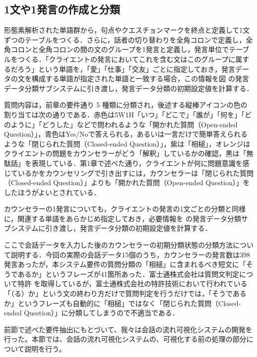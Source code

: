 \documentclass[shuuron]{kuee}
\begin{document}
\subsection{1文や1発言の作成と分類}
形態素解析された単語群から，句点やクエスチョンマークを終点と定義して1文ずつのテーブルをつくる．さらに，話者の切り替わりを全角コロンで定義し，全角コロンと全角コロンの間の文のグループを1発言と定義し，発言単位でテーブルをつくる．「クライエントの発言においてこれを含む文はこのグループに属するだろう」という単語を，「愛」「仕事」「交友」ごとに指定しておき，発言データの文を構成する単語が指定された単語と一致する場合，この情報を図
の発言データ分類サブシステムに引き渡し，発言データ分類の初期設定値を計算する．



質問内容は，前章の要件通り 5 種類に分類され，後述する縦棒アイコンの色の割り当ては次の通りである．赤色は5W1H「いつ」「どこで」「誰が」「何を」「どのように」「どうした」などで問われるような「開かれた質問（Open-ended Question）」，青色はYes/Noで答えられる，あるいは一言だけで簡単答えられるような「閉じられた質問（Closed-ended Question）」，紫は「相槌」，オレンジはクライエントの問題をカウンセラーがどう「解釈」しているかの確認，黒は「無駄話」を表現している．第1章で述べた通り，クライエントが何に問題意識を感じているかをカウンセリングで引き出すには，カウンセラーは「閉じられた質問（Closed-ended Question）」よりも「開かれた質問（Open-ended Question）」をしたほうがよいとされている．


カウンセラーの1発言についても，クライエントの発言の1文ごとの分類と同様に，関連する単語をあらかじめ指定しておき，必要情報を
の発言データ分類サブシステムに引き渡し，発言データ分類の初期設定値を計算する．

ここで会話データを入力した後のカウンセラーの初期分類状態の分類方法について説明する．今回の実際の会話データ15個のうち，カウンセラーの発言数は398発言あったが，本システム要件の質問分類の「相槌」に含まれるべき短文に「そうであるか」というフレーズが41箇所あった．富士通株式会社は質問文判定について特許
を取得しているが，富士通株式会社の特許技術において行われている「（る）か」という文の終わり方だけで質問判定を行うだけでは，「そうであるか」というフレーズも自動的に「相槌」ではなく「閉じられた質問（Closed-ended Question）」に分類してしまうので不適当である．



前節で述べた要件抽出にもとづいて、我々は会話の流れ可視化システムの開発を行った。本節では、会話の流れ可視化システムの、可視化する前の処理の部分について説明を行う。
\end{document}
